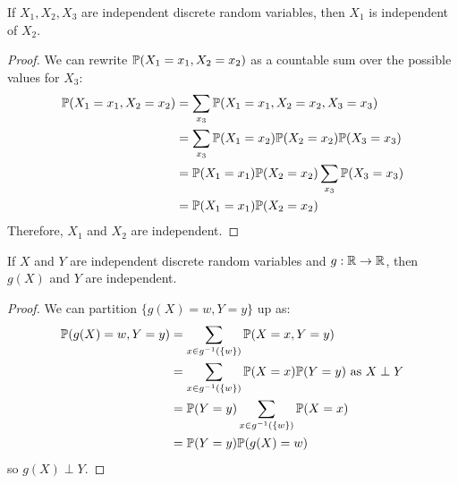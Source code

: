 \documentclass[../main.tex]{subfiles}
\begin{document}
\begin{lemma}
  If $X_1, X_2, X_3$ are independent discrete random variables, then $X_1$ is independent of $X_2$.
\end{lemma}
\begin{proof}
  We can rewrite $\P(X_1 = x_1, X_2 = x_2)$ as a countable sum over the possible values for $X_3$:
  \begin{align*}
    \P(X_1 = x_1, X_2 = x_2) &= \sum_{x_3} \P(X_1 = x_1, X_2 = x_2, X_3 = x_3) \\
                             &= \sum_{x_3} \P(X_1 = x_2)\P(X_2 = x_2)\P(X_3 = x_3) \\
                             &= \P(X_1 = x_1)\P(X_2 = x_2) \sum_{x_3} \P(X_3 = x_3) \\
                             &= \P(X_1 = x_1)\P(X_2 = x_2)
  \end{align*}
  Therefore, $X_1$ and $X_2$ are independent.
\end{proof}
\begin{lemma}
  If $X$ and $Y$ are independent discrete random variables and $g: \R \to \R$, then $g(X)$ and $Y$ are independent.
  \label{rvFunctionIndependence}
\end{lemma}
\begin{proof}
  We can partition $\{g(X) = w, Y = y\}$ up as:
  \begin{align*}
    \P(g(X) = w, Y = y) &= \sum_{x \in g^{-1}(\{w\})} \P(X = x, Y = y) \\
                        &= \sum_{x \in g^{-1}(\{w\})} \P(X = x)\P(Y = y) \text{ as $X \perp Y$}\\
                        &= \P(Y = y) \sum_{x \in g^{-1}(\{w\})} \P(X = x) \\
                        &= \P(Y = y)\P(g(X) = w)
  \end{align*}
  so $g(X) \perp Y$.
\end{proof}
\end{document}
